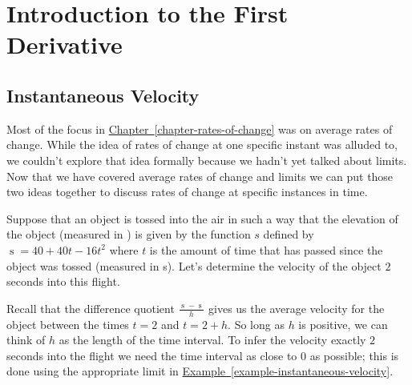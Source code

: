 \documentclass[12pt,]{book}
\theoremstyle{plain}
\theoremstyle{definition}
\numberwithin{equation}{section}
\newcommand{\fe}[2]{\mathop{{#1}{\left(#2\right)}}}
\begin{document}
\typeout{************************************************}
\typeout{************************************************}
\chapter[Introduction to the First Derivative]{Introduction to the First Derivative}\label{chapter-introduction-first-derivative}
\typeout{************************************************}
\typeout{************************************************}
\section[Instantaneous Velocity]{Instantaneous Velocity}\label{section-instantaneous-velocity}
Most of the focus in \hyperref[chapter-rates-of-change]{Chapter~\ref*{chapter-rates-of-change}} was on average rates of change. While the idea of rates of change at one specific instant was alluded to, we couldn't explore that idea formally because we hadn't yet talked about limits. Now that we have covered average rates of change and limits we can put those two ideas together to discuss rates of change at specific instances in time.%
\par
Suppose that an object is tossed into the air in such a way that the elevation of the object (measured in \si{\foot}) is given by the function \(s\) defined by \(\fe{s}{t}=40+40t-16t^2\) where \(t\) is the amount of time that has passed since the object was tossed (measured in \si{\second}). Let's determine the velocity of the object \(2\) seconds into this flight.%
\par
Recall that the difference quotient \(\frac{\fe{s}{2+h}-\fe{s}{2}}{h}\) gives us the average velocity for the object between the times \(t=2\) and \(t=2+h\). So long as \(h\) is positive, we can think of \(h\) as the length of the time interval. To infer the velocity exactly \(2\) seconds into the flight we need the time interval as close to \(0\) as possible; this is done using the appropriate limit in \hyperref[example-instantaneous-velocity]{Example~\ref*{example-instantaneous-velocity}}.%
\end{document}
